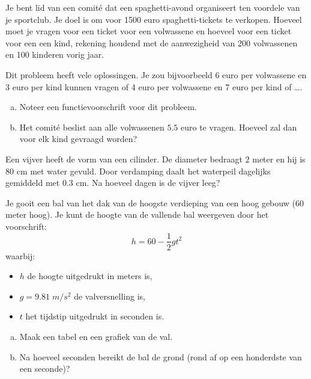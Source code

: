 \documentclass[12pt]{article}
\begin{document}
\begin{oefening}
Je bent lid van een comité dat een spaghetti-avond organiseert ten voordele van je sportclub. Je doel is om voor 1500 euro spaghetti-tickets te verkopen. Hoeveel moet je vragen voor een ticket voor een volwassene en hoeveel voor een ticket voor een een kind, rekening houdend met de aanwezigheid van 200 volwassenen en 100 kinderen vorig jaar.

Dit probleem heeft vele oplossingen. Je zou bijvoorbeeld 6 euro per volwassene en 3 euro per kind kunnen vragen of 4 euro per volwassene en 7 euro per kind of \ldots.
\begin{enumerate}[(a)]
  \item Noteer een functievoorschrift voor dit probleem.
  \item Het comité beslist aan alle volwassenen $5.5$ euro te vragen. Hoeveel zal dan voor elk kind gevraagd worden?
\end{enumerate}
\end{oefening}

\begin{oefening}
Een vijver heeft de vorm van een cilinder. De diameter bedraagt $2$ meter en hij is $80$ cm met water gevuld. Door verdamping daalt het waterpeil dagelijks gemiddeld met $0.3$ cm. Na hoeveel dagen is de vijver leeg?
\end{oefening}

\begin{oefening}
Je gooit een bal van het dak van de hoogste verdieping van een hoog gebouw ($60$ meter hoog). Je kunt de hoogte van de vallende bal weergeven door het voorschrift:
$$h=60-\frac{1}{2}gt^2$$
waarbij:
\begin{itemize}
  \item $h$ de hoogte uitgedrukt in meters is,
  \item $g=9.81 \;m/s^2$ de valversnelling is,
  \item $t$ het tijdstip uitgedrukt in seconden is.
\end{itemize}
\begin{enumerate}[(a)]
  \item Maak een tabel en een grafiek van de val.
  \item Na hoeveel seconden bereikt de bal de grond (rond af op een honderdste van een seconde)?
\end{enumerate}
\end{oefening}
\end{document}
